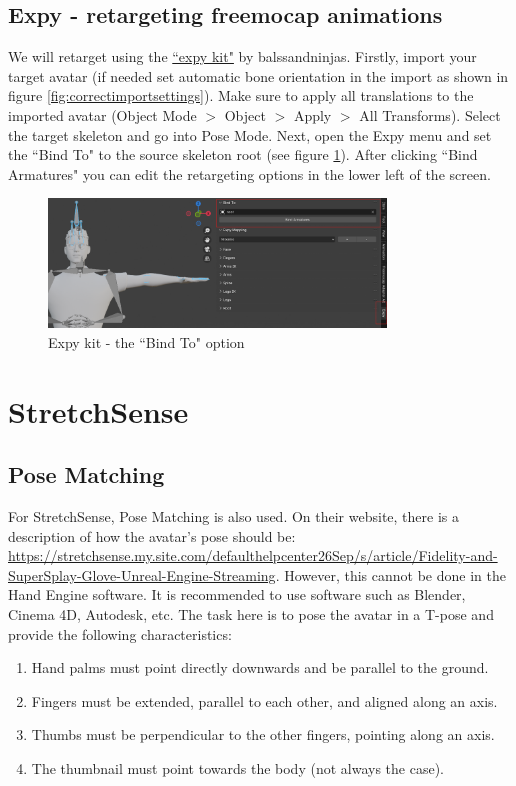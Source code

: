 \documentclass{uva-inf-article}
\begin{document}
\subsection{Expy - retargeting freemocap animations}
We will retarget using the \href{https://ballsandninjas.gumroad.com/l/xotibs}{``expy kit"} by balssandninjas. Firstly, import your target avatar (if needed set automatic bone orientation in the import as shown in figure \ref{fig:correctimportsettings}). Make sure to apply all translations to the imported avatar (Object Mode $>$ Object $>$ Apply $>$ All Transforms). Select the target skeleton and go into Pose Mode. Next, open the Expy menu and set the ``Bind To" to the source skeleton root (see figure \ref{fig:retargetexpy}).
After clicking ``Bind Armatures" you can edit the retargeting options in the lower left of the screen.
\begin{figure}[hbt!]
    \centering
    \includegraphics[width=0.8\textwidth]{imgs/retargetExpy.png}
    \caption{Expy kit - the ``Bind To" option}
    \label{fig:retargetexpy}
\end{figure}
\section{StretchSense}\label{section:stretchsense}
\subsection{Pose Matching}
For StretchSense, Pose Matching is also used. On their website, there is a description of how the avatar's pose should be: \url{https://stretchsense.my.site.com/defaulthelpcenter26Sep/s/article/Fidelity-and-SuperSplay-Glove-Unreal-Engine-Streaming}. However, this cannot be done in the Hand Engine software. It is recommended to use software such as Blender, Cinema 4D, Autodesk, etc. The task here is to pose the avatar in a T-pose and provide the following characteristics:
\begin{enumerate}
    \item Hand palms must point directly downwards and be parallel to the ground.
    \item Fingers must be extended, parallel to each other, and aligned along an axis.
    \item Thumbs must be perpendicular to the other fingers, pointing along an axis.
    \item The thumbnail must point towards the body (not always the case).
\end{enumerate}
\end{document}
